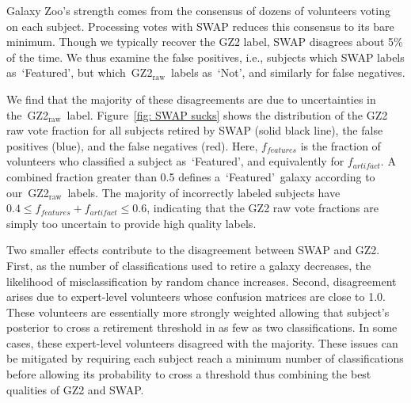 \documentclass[twocolumn]{aastex6}
\newcommand{\feat}{`Featured'}
\newcommand{\notfeat}{`Not'}
\newcommand{\raw}{GZ2$_{\text{raw}}$}
\begin{document}
Galaxy Zoo's strength comes from the consensus of dozens of volunteers voting on each subject. 
Processing votes with SWAP reduces this consensus to its bare minimum. 
Though we typically recover the GZ2 label, SWAP disagrees about 5\% of the time. 
We thus examine the false positives, i.e., subjects which SWAP labels as~\feat, but which~\raw~labels as~\notfeat, and similarly for false negatives.


We find that the majority of these disagreements are due to uncertainties in 
the~\raw~label. Figure~\ref{fig: SWAP sucks} shows the distribution of the GZ2 
raw vote fraction for all subjects retired by SWAP (solid black line), the 
false positives (blue), and the false negatives (red).  Here, $f_{features}$ is 
the fraction of volunteers who classified a subject as~\feat, and equivalently for
$f_{artifact}$. A combined fraction greater than 0.5 defines a~\feat~galaxy
according to our~\raw~labels. The majority of incorrectly 
labeled subjects have $0.4 \le f_{features}+f_{artifact} \le 0.6$, indicating that 
the GZ2 raw vote fractions are simply too uncertain to provide high quality labels. 


Two smaller effects contribute to the disagreement between SWAP and GZ2. 
First, as the number of classifications used to retire a galaxy decreases, the 
likelihood of misclassification by random chance increases. 
Second, disagreement arises due to expert-level volunteers whose confusion 
matrices are close to 1.0. These volunteers are essentially more 
strongly weighted allowing that subject's posterior to cross a retirement threshold
in as few as two classifications. In some cases, these expert-level volunteers disagreed 
with the majority. These issues can be mitigated by requiring each subject reach 
a minimum number of classifications before allowing its probability to cross a 
threshold thus combining the best qualities of GZ2 and SWAP. 
\end{document}
